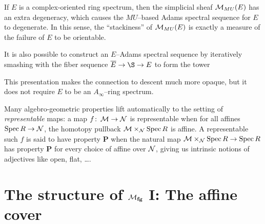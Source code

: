 \begin{remark}\label{StackinessMeasuresNonorientability}
If \(E\) is a complex-oriented ring spectrum, then the simplicial sheaf \(\mathcal{M}_{MU}(E)\) has an extra degeneracy, which causes the \(MU\)--based Adams spectral sequence for \(E\) to degenerate.  In this sense, the ``stackiness'' of \(\mathcal{M}_{MU}(E)\) is exactly a measure of the failure of \(E\) to be orientable.
\end{remark}

\begin{remark}
It is also possible to construct an \(E\)--Adams spectral sequence by iteratively smashing with the fiber sequence \(\overline E \to \S \to E\) to form the tower
\begin{center}
\end{center}
This presentation makes the connection to descent much more opaque, but it does not require \(E\) to be an \(A_\infty\)--ring spectrum.
\end{remark}

\begin{remark}
Many algebro-geometric properties lift automatically to the setting of \textit{representable} maps: a map \(f\colon\thinspace \mathcal{M} \to \mathcal{N}\) is representable when for all affines \(\operatorname{Spec} R \to \mathcal{N}\), the homotopy pullback \(\mathcal{M} \times_{\mathcal{N}} \operatorname{Spec} R\) is affine.  A representable such \(f\) is said to have property \textbf{P} when the natural map \(\mathcal{M} \times_{\mathcal{N}} \operatorname{Spec} R \to \operatorname{Spec} R\) has property \textbf{P} for every choice of affine over \(\mathcal{N}\), giving us intrinsic notions of adjectives like open, flat, \ldots.
\end{remark}










\section{The structure of \texorpdfstring{\(\mathcal{M}_{\mathbf{fg}}\)}{Mfg} I: The affine cover}\label{MfgI:AffineCover}

